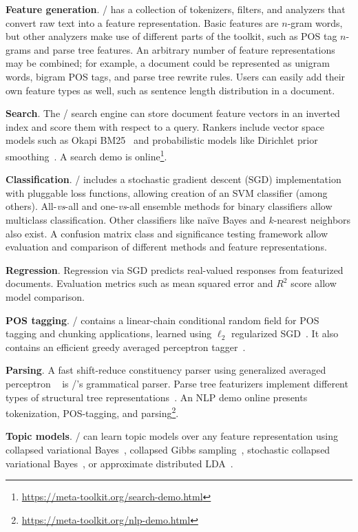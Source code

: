 \textbf{Feature generation}.
\meta/ has a collection of tokenizers, filters, and analyzers that convert raw
text into a feature representation. Basic features are $n$-gram words, but other
analyzers make use of different parts of the toolkit, such as POS tag $n$-grams
and parse tree features. An arbitrary number of feature representations may be
combined; for example, a document could be represented as unigram words, bigram
POS tags, and parse tree rewrite rules. Users can easily add their own feature
types as well, such as sentence length distribution in a document.

\textbf{Search}.
The \meta/ search engine can store document feature vectors in an inverted index
and score them with respect to a query. Rankers include vector space models such
as Okapi BM25~\citep{bm25} and probabilistic models like Dirichlet prior
smoothing~\citep{zhai-lm}. A search demo is
online\footnote{\url{https://meta-toolkit.org/search-demo.html}}.

\textbf{Classification}.
\meta/ includes a stochastic gradient descent (SGD) implementation with
pluggable loss functions, allowing creation of an SVM classifier (among others).
All-\emph{vs}-all and one-\emph{vs}-all ensemble methods for binary classifiers
allow multiclass classification. Other classifiers like na{\"i}ve Bayes and
$k$-nearest neighbors also exist. A confusion matrix class and significance
testing framework allow evaluation and comparison of different methods and
feature representations.

\textbf{Regression}.
Regression via SGD predicts real-valued responses from featurized documents.
Evaluation metrics such as mean squared error and $R^2$ score allow model
comparison.

\textbf{POS tagging}.
\meta/ contains a linear-chain conditional random field for POS tagging and
chunking applications, learned using $\ell_2$ regularized SGD~\citep{crf}. It
also contains an efficient greedy averaged perceptron tagger~\citep{greedy}.

\textbf{Parsing}.
A fast shift-reduce constituency parser using generalized averaged perceptron
~\citep{const-parsing} is \meta/'s grammatical parser. Parse tree featurizers
implement different types of structural tree representations~\citep{structural}.
An NLP demo online presents tokenization, POS-tagging, and
parsing\footnote{\url{https://meta-toolkit.org/nlp-demo.html}}.

\textbf{Topic models}.
\meta/ can learn topic models over any feature representation using collapsed
variational Bayes~\citep{cvb}, collapsed Gibbs sampling~\citep{gibbs}, stochastic
collapsed variational Bayes~\citep{scvb}, or approximate distributed
LDA~\citep{pargibbs}.

